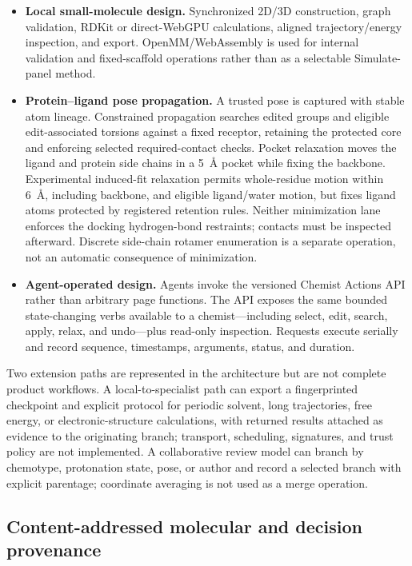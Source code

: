 \documentclass[11pt]{article}
\begin{document}
\begin{small}
\begin{itemize}[leftmargin=*]
\item \textbf{Local small-molecule design.} Synchronized 2D/3D construction, graph validation, RDKit or direct-WebGPU calculations, aligned trajectory/energy inspection, and export. OpenMM/WebAssembly is used for internal validation and fixed-scaffold operations rather than as a selectable Simulate-panel method.
\item \textbf{Protein--ligand pose propagation.} A trusted pose is captured with stable atom lineage. Constrained propagation searches edited groups and eligible edit-associated torsions against a fixed receptor, retaining the protected core and enforcing selected required-contact checks. Pocket relaxation moves the ligand and protein side chains in a 5~\AA{} pocket while fixing the backbone. Experimental induced-fit relaxation permits whole-residue motion within 6~\AA{}, including backbone, and eligible ligand/water motion, but fixes ligand atoms protected by registered retention rules. Neither minimization lane enforces the docking hydrogen-bond restraints; contacts must be inspected afterward. Discrete side-chain rotamer enumeration is a separate operation, not an automatic consequence of minimization.
\item \textbf{Agent-operated design.} Agents invoke the versioned Chemist Actions API rather than arbitrary page functions. The API exposes the same bounded state-changing verbs available to a chemist---including select, edit, search, apply, relax, and undo---plus read-only inspection. Requests execute serially and record sequence, timestamps, arguments, status, and duration.
\end{itemize}

Two extension paths are represented in the architecture but are not complete product workflows. A local-to-specialist path can export a fingerprinted checkpoint and explicit protocol for periodic solvent, long trajectories, free energy, or electronic-structure calculations, with returned results attached as evidence to the originating branch; transport, scheduling, signatures, and trust policy are not implemented. A collaborative review model can branch by chemotype, protonation state, pose, or author and record a selected branch with explicit parentage; coordinate averaging is not used as a merge operation.

\subsection{Content-addressed molecular and decision provenance}


\end{small}
\end{document}
